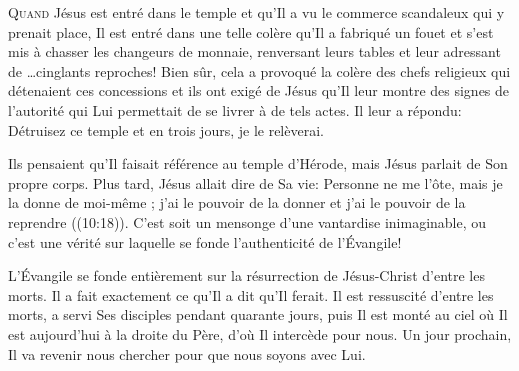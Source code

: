 



\lettrine{Q}{uand} Jésus est entré dans le temple et qu'Il a vu le commerce
 scandaleux qui y prenait place, Il est entré dans une telle colère
 qu'Il a fabriqué un fouet et s'est mis à chasser les changeurs
 de monnaie, renversant leurs tables et leur adressant
 de \dots cinglants reproches!
 Bien sûr, cela a provoqué la colère des chefs religieux
 qui détenaient ces concessions et ils ont exigé de Jésus
 qu'Il leur montre des signes de l'autorité qui Lui permettait
 de se livrer à de tels actes.
 Il leur a répondu: 
 \Og Détruisez ce temple et en trois jours, je le relèverai. \Fg{}

Ils pensaient qu'Il faisait référence au temple d'Hérode,
 mais Jésus parlait de Son propre corps.
 Plus tard, Jésus allait dire de Sa vie: 
 \Og Personne ne me l'ôte, mais je la donne de moi-même ;
 j'ai le pouvoir de la donner et j'ai le pouvoir de la reprendre \Fg{}
 ((10:18)).
 C'est soit un mensonge d'une vantardise inimaginable,
 ou c'est une vérité sur laquelle se fonde
 l'authenticité de l'Évangile!


L'Évangile se fonde entièrement sur la résurrection
 de Jésus-Christ d'entre les morts.
 Il a fait exactement ce qu'Il a dit qu'Il ferait.
 Il est ressuscité d'entre les morts, a servi Ses disciples
 pendant quarante jours, puis Il est monté au ciel
 où Il est aujourd'hui à la droite du Père,
 d'où Il intercède pour nous.
 Un jour prochain, Il va revenir nous chercher
 pour que nous soyons avec Lui.

\dvrule



